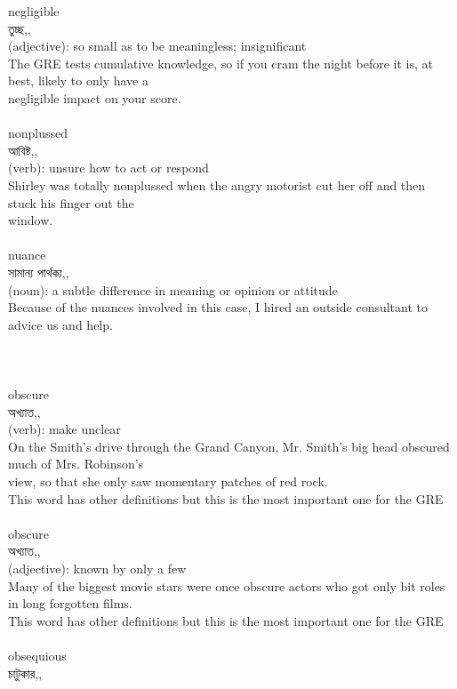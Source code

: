 \documentclass{article}
\begin{document}
{negligible}\\
{তুচ্ছ,,}\\
{(adjective): so small as to be meaningless; insignificant\\The GRE tests cumulative knowledge, so if you cram the night before it is, at best, likely to only have a\\negligible impact on your score.\\}\\
{nonplussed}\\
{আবিষ্ট,,}\\
{(verb): unsure how to act or respond\\Shirley was totally nonplussed when the angry motorist cut her off and then stuck his finger out the\\window.\\}\\
{nuance}\\
{সামান্য পার্থক্য,,}\\
{(noun): a subtle difference in meaning or opinion or attitude\\Because of the nuances involved in this case, I hired an outside consultant to advice us and help.\\\\                                                                                 \\}\\
{obscure}\\
{অখ্যাত,,}\\
{(verb): make unclear\\On the Smith's drive through the Grand Canyon, Mr. Smith's big head obscured much of Mrs. Robinson's\\view, so that she only saw momentary patches of red rock.\\This word has other definitions but this is the most important one for the GRE\\}\\
{obscure}\\
{অখ্যাত,,}\\
{(adjective): known by only a few\\Many of the biggest movie stars were once obscure actors who got only bit roles in long forgotten films.\\This word has other definitions but this is the most important one for the GRE\\}\\
{obsequious}\\
{চাটুকার,,}\\
\end{document}
